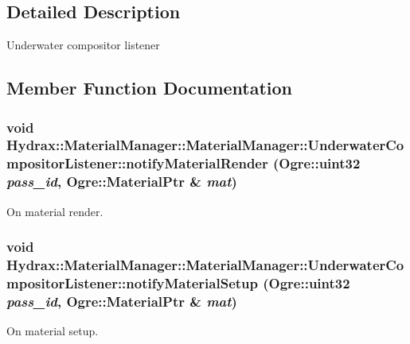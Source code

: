 \subsection{Detailed Description}
Underwater compositor listener 

\subsection{Member Function Documentation}
\hypertarget{class_hydrax_1_1_material_manager_1_1_underwater_compositor_listener_6aa720a9abfebef5671ebe1b4e70bf20}{
\subsubsection[{notifyMaterialRender}]{\setlength{\rightskip}{0pt plus 5cm}void Hydrax::MaterialManager::MaterialManager::UnderwaterCompositorListener::notifyMaterialRender (Ogre::uint32 {\em pass\_\-id}, \/  Ogre::MaterialPtr \& {\em mat})}}
\label{class_hydrax_1_1_material_manager_1_1_underwater_compositor_listener_6aa720a9abfebef5671ebe1b4e70bf20}


On material render. 

\hypertarget{class_hydrax_1_1_material_manager_1_1_underwater_compositor_listener_989ac65c826b38ddd82704221f3f2973}{
\subsubsection[{notifyMaterialSetup}]{\setlength{\rightskip}{0pt plus 5cm}void Hydrax::MaterialManager::MaterialManager::UnderwaterCompositorListener::notifyMaterialSetup (Ogre::uint32 {\em pass\_\-id}, \/  Ogre::MaterialPtr \& {\em mat})}}
\label{class_hydrax_1_1_material_manager_1_1_underwater_compositor_listener_989ac65c826b38ddd82704221f3f2973}


On material setup. 



